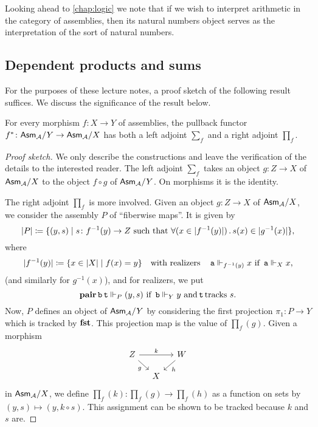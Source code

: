 Looking ahead to \cref{chap:logic} we note that if we wish to interpret
arithmetic in the category of assemblies, then its natural numbers object serves
as the interpretation of the sort of natural numbers.

\subsection{Dependent products and sums}

For the purposes of these lecture notes, a proof sketch of the following result
suffices. We discuss the significance of the result below.

\begin{proposition}\label{base-change-adjoints}
  For every morphism \(f \colon X \to Y\) of assemblies, the pullback functor
  \(f^\ast \colon \mathsf{Asm}_{\mathcal A}/Y \to \mathsf{Asm}_{\mathcal A}/X\) has both a left adjoint
  \(\sum_f\) and a right adjoint \(\prod_f\).
\end{proposition}
\begin{proof}[Proof sketch]
  We only describe the constructions and leave the verification of the details
  to the interested reader.
  The left adjoint \(\sum_f\) takes an object \(g \colon Z \to X\) of
  \(\mathsf{Asm}_{\mathcal A}/X\) to the object \(f \circ g\) of \(\mathsf{Asm}_{\mathcal A}/Y\).
  On morphisms it is the identity.

  The right adjoint \(\prod_f\) is more involved.
  Given an object \(g \colon Z \to X\) of \(\mathsf{Asm}_{\mathcal A}/X\), we consider the
  assembly \(P\) of ``fiberwise maps''. It is given by
  \[
    \lvert P\rvert \coloneq
    \{(y,s) \mid s \colon f^{-1}(y) \to Z \text{ such that }
      \forall(x \in \lvert f^{-1}(y)\rvert)\,.\,s(x) \in \lvert g^{-1}(x)\rvert\},
  \]
  where
  \[
    \lvert f^{-1}(y)\rvert \coloneq \{x \in \lvert X\rvert \mid f(x) = y\}
    \quad\text{with realizers}\quad
    \operatorname{\mathtt{a}} \Vdash_{f^{-1}(y)} x \text{ if } \operatorname{\mathtt{a}} \Vdash_X x,
  \]
  (and similarly for \(g^{-1}(x)\)), and for realizers, we put
  \[
    \operatorname{\mathbf{pair}}\operatorname{\mathtt{b}}\operatorname{\mathtt{t}} \Vdash_P (y,s)
    \text{ if }
    \operatorname{\mathtt{b}} \Vdash_Y y
    \text{ and}
    \operatorname{\mathtt{t}} \text{tracks } s.
  \]
  Now, \(P\) defines an object of \(\mathsf{Asm}_{\mathcal A}/Y\) by considering the first
  projection \(\pi_1 \colon P \to Y\) which is tracked by \(\operatorname{\mathbf{fst}}\).
  This projection map is the value of \(\prod_f(g)\).
  Given a morphism
  \[
    \begin{tikzcd}[row sep=4mm,column sep=4mm]
      Z \ar[rr,"k"] \ar[dr,"g"'] & & W \ar[dl,"h"] \\
      & X
    \end{tikzcd}
  \]
  in \(\mathsf{Asm}_{\mathcal A}/X\), we define \(\prod_f(k) \colon \prod_f(g) \to \prod_f(h)\)
  as a function on sets by \((y,s) \mapsto (y, k \circ s)\). This assignment can
  be shown to be tracked because \(k\) and \(s\) are.
\end{proof}

